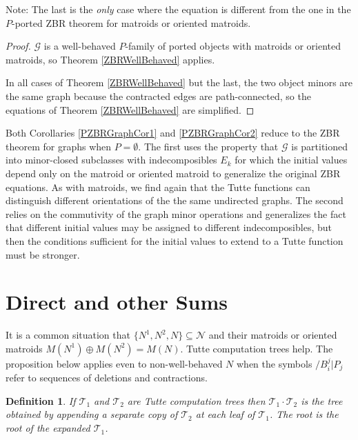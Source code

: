\documentclass[12pt,leqno]{amsart}
\newtheorem{definition}[lem]{Definition}
\theoremstyle{remark}
\begin{document}
Note: The last is the \emph{only} case where the equation is 
different from the one in the $P$-ported ZBR theorem for matroids
or oriented matroids.  

\begin{proof}
$\mathcal{G}$ is a well-behaved $P$-family of ported objects
with matroids or oriented matroids, so Theorem \ref{ZBRWellBehaved}
applies.

In all cases of Theorem \ref{ZBRWellBehaved} but the
last, the two object minors are the same graph 
because the contracted edges are path-connected,
so the equations of Theorem \ref{ZBRWellBehaved} are simplified.
\end{proof}

Both Corollaries \ref{PZBRGraphCor1} and \ref{PZBRGraphCor2} reduce
to the ZBR theorem for graphs when $P=\emptyset$.  The first
uses the property that $\mathcal{G}$ is partitioned into
minor-closed subclasses with indecomposibles $E_k$ 
for which the
initial values depend only on the matroid or oriented matroid to generalize
the original ZBR equations.  As with matroids, we find again that
the Tutte functions can distinguish different orientations of the 
the same undirected graphs.
The second relies on the 
commutivity of the graph minor operations and generalizes
the fact that different initial values may be assigned to
different indecomposibles, but then the 
conditions sufficient for the initial values to
extend to a Tutte function must be stronger.


\section{Direct and other Sums} 
\label{DirectSec}

It is a common situation that $\{N^1,N^2,N\}\subseteq\mathcal{N}$
and their matroids or oriented matroids $M(N^1)\oplus M(N^2)=M(N)$.
Tutte computation trees help.  The proposition below applies
even to non-well-behaved $N$ when the symbols
$/B^j_i|P_j$ refer to sequences of deletions and contractions.

\begin{definition}
If $\mathcal{T}_1$ and $\mathcal{T}_2$ are Tutte computation trees then
$\mathcal{T}_1\cdot \mathcal{T}_2$ is the tree obtained by appending
a separate copy of $\mathcal{T}_2$ at each leaf of $\mathcal{T}_1$.
The root is the root of the expanded $\mathcal{T}_1$.
\end{definition}
\end{document}
